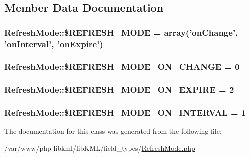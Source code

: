 \subsection{Member Data Documentation}
\hypertarget{classRefreshMode_af9a863d2861023ae46c1e309b2297cc1}{
\subsubsection[{\$REFRESH\_\-MODE}]{\setlength{\rightskip}{0pt plus 5cm}RefreshMode::\$REFRESH\_\-MODE = array('onChange', 'onInterval', 'onExpire')}}
\label{dc/de2/classRefreshMode_af9a863d2861023ae46c1e309b2297cc1}
\hypertarget{classRefreshMode_a6ba540745a69b8b4920d3e9f263213a2}{
\subsubsection[{\$REFRESH\_\-MODE\_\-ON\_\-CHANGE}]{\setlength{\rightskip}{0pt plus 5cm}RefreshMode::\$REFRESH\_\-MODE\_\-ON\_\-CHANGE = 0}}
\label{dc/de2/classRefreshMode_a6ba540745a69b8b4920d3e9f263213a2}
\hypertarget{classRefreshMode_a674324945858a4c20652492f08f439c8}{
\subsubsection[{\$REFRESH\_\-MODE\_\-ON\_\-EXPIRE}]{\setlength{\rightskip}{0pt plus 5cm}RefreshMode::\$REFRESH\_\-MODE\_\-ON\_\-EXPIRE = 2}}
\label{dc/de2/classRefreshMode_a674324945858a4c20652492f08f439c8}
\hypertarget{classRefreshMode_aad1d173eaf17ec896b64edb760c8c2be}{
\subsubsection[{\$REFRESH\_\-MODE\_\-ON\_\-INTERVAL}]{\setlength{\rightskip}{0pt plus 5cm}RefreshMode::\$REFRESH\_\-MODE\_\-ON\_\-INTERVAL = 1}}
\label{dc/de2/classRefreshMode_aad1d173eaf17ec896b64edb760c8c2be}


The documentation for this class was generated from the following file:\begin{DoxyCompactItemize}
\item 
/var/www/php-\/libkml/libKML/field\_\-types/\hyperlink{RefreshMode_8php}{RefreshMode.php}\end{DoxyCompactItemize}
